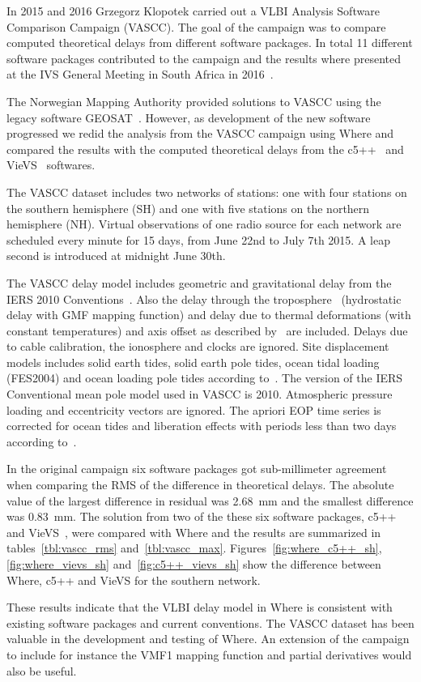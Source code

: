 In 2015 and 2016 Grzegorz Klopotek carried out a VLBI Analysis Software
Comparison Campaign (VASCC). The goal of the campaign was to compare computed
theoretical delays from different software packages. In total 11 different
software packages contributed to the campaign and the results where presented at
the IVS General Meeting in South Africa in 2016~\cite{klopotek2016}.

The Norwegian Mapping Authority provided solutions to VASCC using the legacy
software GEOSAT~\cite{kierulf2010}. However, as development of the new software
progressed we redid the analysis from the VASCC campaign using Where and
compared the results with the computed theoretical delays from the
c5++~\cite{hobiger2010} and VieVS~\cite{boehm2012} softwares.

The VASCC dataset includes two networks of stations: one with four stations on
the southern hemisphere (SH) and one with five stations on the northern
hemisphere (NH).  Virtual observations of one radio source for each network are
scheduled every minute for 15 days, from June 22nd to July 7th 2015. A leap
second is introduced at midnight June 30th.

The VASCC delay model includes geometric and gravitational delay from the IERS
2010 Conventions~\cite{iers2010}. Also the delay through the
troposphere~\cite{iers2010} (hydrostatic delay with GMF mapping function) and
delay due to thermal deformations (with constant temperatures) and axis offset
as described by~\cite{nothnagel2009} are included. Delays due to cable
calibration, the ionosphere and clocks are ignored. Site displacement models
includes solid earth tides, solid earth pole tides, ocean tidal loading
(FES2004) and ocean loading pole tides according to~\cite{iers2010}. The version
of the IERS Conventional mean pole model used in VASCC is 2010. Atmospheric
pressure loading and eccentricity vectors are ignored. The apriori EOP time
series is corrected for ocean tides and liberation effects with periods less
than two days according to~\cite{iers2010}.

In the original campaign six software packages got sub-millimeter agreement when
comparing the RMS of the difference in theoretical delays. The absolute value of
the largest difference in residual was 2.68~mm and the smallest difference was
0.83~mm. The solution from two of the these six software packages,
c5++~\cite{hobiger2010} and VieVS~\cite{boehm2012}, were compared with Where and
the results are summarized in tables~\ref{tbl:vascc_rms}
and~\ref{tbl:vascc_max}. Figures~\ref{fig:where_c5++_sh}, \ref{fig:where_vievs_sh}
and~\ref{fig:c5++_vievs_sh} show the difference between Where, c5++ and VieVS
for the southern network.

These results indicate that the VLBI delay model in Where is consistent with
existing software packages and current conventions. The VASCC dataset
has been valuable in the development and testing of Where. An extension of the
campaign to include for instance the VMF1 mapping function and partial
derivatives would also be useful.

\endinput
